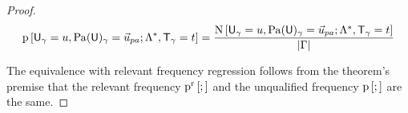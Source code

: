 \documentclass[twoside,11pt]{article}
\begin{document}
\begin{proof}
\begin{equation} \label{eq:prob}
\Freq{\Appendterm{\Ground{\UI}  = \UV} {\Ground{\Pa{\UI}} = \Prange{\UT}}} {\QC,\Ground{\TI} = \TV} 
= \frac{\BigCount{\Appendterm{\Ground{\UI}  = \UV} {\Ground{\Pa{\UI}} = \Prange{\UT}}} {\QC,\Ground{\TI} = \TV}}{|\groundall|}
\end{equation}

The equivalence with relevant frequency regression follows from the theorem's premise that the relevant frequency $\mathrm{p}^{\mathrm{r}}\left[;\right]$ and the unqualified frequency $\mathrm{p}\left[;\right]$ are the same. 
%


\end{proof}
\end{document}
